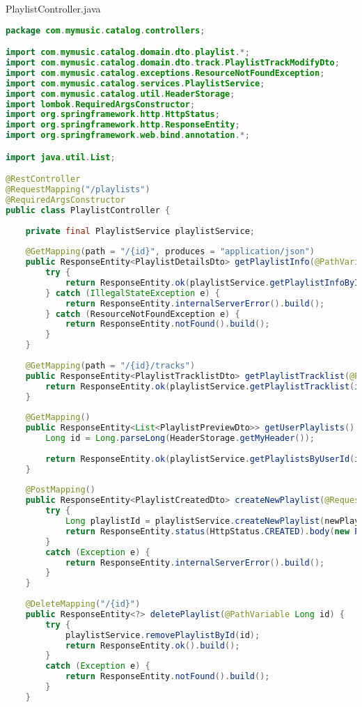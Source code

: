 PlaylistController.java
\begin{lstlisting}[language=java]
package com.mymusic.catalog.controllers;

import com.mymusic.catalog.domain.dto.playlist.*;
import com.mymusic.catalog.domain.dto.track.PlaylistTrackModifyDto;
import com.mymusic.catalog.exceptions.ResourceNotFoundException;
import com.mymusic.catalog.services.PlaylistService;
import com.mymusic.catalog.util.HeaderStorage;
import lombok.RequiredArgsConstructor;
import org.springframework.http.HttpStatus;
import org.springframework.http.ResponseEntity;
import org.springframework.web.bind.annotation.*;

import java.util.List;

@RestController
@RequestMapping("/playlists")
@RequiredArgsConstructor
public class PlaylistController {
	
	private final PlaylistService playlistService;
	
	@GetMapping(path = "/{id}", produces = "application/json")
	public ResponseEntity<PlaylistDetailsDto> getPlaylistInfo(@PathVariable("id") Long id) {
		try {
			return ResponseEntity.ok(playlistService.getPlaylistInfoById(id));
		} catch (IllegalStateException e) {
			return ResponseEntity.internalServerError().build();
		} catch (ResourceNotFoundException e) {
			return ResponseEntity.notFound().build();
		}
	}
	
	@GetMapping(path = "/{id}/tracks")
	public ResponseEntity<PlaylistTracklistDto> getPlaylistTracklist(@PathVariable("id") Long id) {
		return ResponseEntity.ok(playlistService.getPlaylistTracklist(id));
	}
	
	@GetMapping()
	public ResponseEntity<List<PlaylistPreviewDto>> getUserPlaylists() {
		Long id = Long.parseLong(HeaderStorage.getMyHeader());
		
		return ResponseEntity.ok(playlistService.getPlaylistsByUserId(id));
	}
	
	@PostMapping()
	public ResponseEntity<PlaylistCreatedDto> createNewPlaylist(@RequestBody CreatePlaylistRequestDto newPlaylist) {
		try {
			Long playlistId = playlistService.createNewPlaylist(newPlaylist);
			return ResponseEntity.status(HttpStatus.CREATED).body(new PlaylistCreatedDto(playlistId));
		}
		catch (Exception e) {
			return ResponseEntity.internalServerError().build();
		}
	}
	
	@DeleteMapping("/{id}")
	public ResponseEntity<?> deletePlaylist(@PathVariable Long id) {
		try {
			playlistService.removePlaylistById(id);
			return ResponseEntity.ok().build();
		}
		catch (Exception e) {
			return ResponseEntity.notFound().build();
		}
	}
	

\end{lstlisting}
